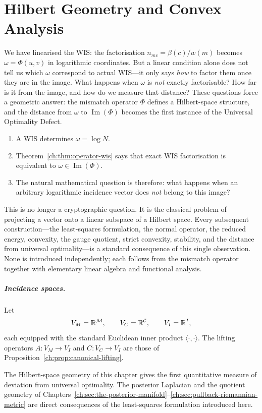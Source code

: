 \chapter[Hilbert Geometry]{Hilbert Geometry and Convex Analysis}\label{ch:sec:hilbert-geometry}

We have linearised the WIS: the factorisation $n_{mc}=\beta(c)/w(m)$
becomes $\omega=\Phi(u,v)$ in logarithmic coordinates.
But a linear condition alone does not tell us which $\omega$ correspond
to actual WIS---it only says \emph{how} to factor them once they are in
the image.  What happens when $\omega$ is \emph{not} exactly
factorisable?  How far is it from the image, and how do we measure that
distance?  These questions force a geometric answer: the mismatch
operator $\Phi$ defines a Hilbert-space structure, and the distance from
$\omega$ to $\operatorname{Im}(\Phi)$ becomes the first instance of the
Universal Optimality Defect.
\begin{enumerate}
\item A WIS determines $\omega=\log N$.
\item Theorem~\ref{ch:thm:operator-wis} says that exact WIS factorisation
is equivalent to $\omega\in\operatorname{Im}(\Phi)$.
\item The natural mathematical question is therefore: what happens when
an arbitrary logarithmic incidence vector does \emph{not} belong to this
image?
\end{enumerate}
This is no longer a cryptographic question.  It is the classical
problem of projecting a vector onto a linear subspace of a Hilbert
space.  Every subsequent construction---the least-squares formulation,
the normal operator, the reduced energy, convexity, the gauge quotient,
strict convexity, stability, and the distance from universal
optimality---is a standard consequence of this single observation.
None is introduced independently; each follows from the mismatch
operator together with elementary linear algebra and functional
analysis.
\paragraph{Incidence spaces.}
Let
\[
V_M=\mathbb R^{\mathcal{M}},\qquad V_C=\mathbb R^{\mathcal{C}},\qquad V_I=\mathbb R^{I},
\]
each equipped with the standard Euclidean inner product $\langle\cdot,\cdot\rangle$.  The lifting operators $A:V_M\to V_I$ and $C:V_C\to V_I$ are those of Proposition~\ref{ch:prop:canonical-lifting}.

The Hilbert-space geometry of this chapter gives the first quantitative measure of deviation from universal optimality. The posterior Laplacian and the quotient geometry of Chapters~\ref{ch:sec:the-posterior-manifold}--\ref{ch:sec:pullback-riemannian-metric} are direct consequences of the least-squares formulation introduced here.


